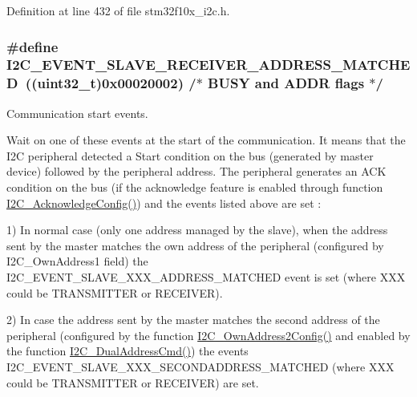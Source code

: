Definition at line 432 of file stm32f10x\+\_\+i2c.\+h.

\subsubsection[{\texorpdfstring{I2\+C\+\_\+\+E\+V\+E\+N\+T\+\_\+\+S\+L\+A\+V\+E\+\_\+\+R\+E\+C\+E\+I\+V\+E\+R\+\_\+\+A\+D\+D\+R\+E\+S\+S\+\_\+\+M\+A\+T\+C\+H\+ED}{I2C_EVENT_SLAVE_RECEIVER_ADDRESS_MATCHED}}]{\setlength{\rightskip}{0pt plus 5cm}\#define I2\+C\+\_\+\+E\+V\+E\+N\+T\+\_\+\+S\+L\+A\+V\+E\+\_\+\+R\+E\+C\+E\+I\+V\+E\+R\+\_\+\+A\+D\+D\+R\+E\+S\+S\+\_\+\+M\+A\+T\+C\+H\+ED~(({\bf uint32\+\_\+t})0x00020002) /$\ast$ B\+U\+S\+Y and A\+D\+D\+R flags $\ast$/}\hypertarget{group___i2_c___events_ga6cf0e334704618b024eee604849f50f7}{}\label{group___i2_c___events_ga6cf0e334704618b024eee604849f50f7}


Communication start events. 

Wait on one of these events at the start of the communication. It means that the I2C peripheral detected a Start condition on the bus (generated by master device) followed by the peripheral address. The peripheral generates an A\+CK condition on the bus (if the acknowledge feature is enabled through function \hyperlink{group___i2_c___private___functions_ga7bb44e894d68a7991f564c43fb187486}{I2\+C\+\_\+\+Acknowledge\+Config()}) and the events listed above are set \+:

1) In normal case (only one address managed by the slave), when the address sent by the master matches the own address of the peripheral (configured by I2\+C\+\_\+\+Own\+Address1 field) the I2\+C\+\_\+\+E\+V\+E\+N\+T\+\_\+\+S\+L\+A\+V\+E\+\_\+\+X\+X\+X\+\_\+\+A\+D\+D\+R\+E\+S\+S\+\_\+\+M\+A\+T\+C\+H\+ED event is set (where X\+XX could be T\+R\+A\+N\+S\+M\+I\+T\+T\+ER or R\+E\+C\+E\+I\+V\+ER).

2) In case the address sent by the master matches the second address of the peripheral (configured by the function \hyperlink{group___i2_c___private___functions_ga7be2cc634a613c8e3539137e897a22df}{I2\+C\+\_\+\+Own\+Address2\+Config()} and enabled by the function \hyperlink{group___i2_c___private___functions_ga02145a333a56e79557d6ef4ea03fc313}{I2\+C\+\_\+\+Dual\+Address\+Cmd()}) the events I2\+C\+\_\+\+E\+V\+E\+N\+T\+\_\+\+S\+L\+A\+V\+E\+\_\+\+X\+X\+X\+\_\+\+S\+E\+C\+O\+N\+D\+A\+D\+D\+R\+E\+S\+S\+\_\+\+M\+A\+T\+C\+H\+ED (where X\+XX could be T\+R\+A\+N\+S\+M\+I\+T\+T\+ER or R\+E\+C\+E\+I\+V\+ER) are set.

